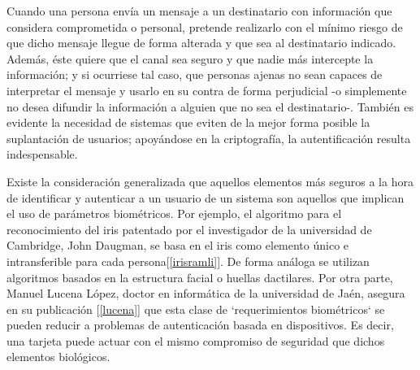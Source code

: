 \documentclass[../PFC.tex]{subfiles}
\begin{document}
Cuando una persona envía un mensaje a un destinatario con información que considera comprometida o personal, pretende realizarlo con el mínimo riesgo de que dicho mensaje llegue de forma alterada y que sea al destinatario indicado. Además, éste quiere que el canal sea seguro y que nadie más intercepte la información; y si ocurriese tal caso, que personas ajenas no sean capaces de interpretar el mensaje y usarlo en su contra de forma perjudicial -o simplemente no desea difundir la información a alguien que no sea el destinatario-. También es evidente la necesidad de sistemas que eviten de la mejor forma posible la suplantación de usuarios; apoyándose en la criptografía, la autentificación resulta indespensable.



Existe la consideración generalizada que aquellos elementos más seguros a la hora de identificar y autenticar a un usuario de un sistema son aquellos que implican el uso de parámetros biométricos. Por ejemplo, el algoritmo para el reconocimiento del iris patentado por el investigador de la universidad de Cambridge, John Daugman, se basa en el iris como elemento único e intransferible para cada persona[\ref{irisramli}]. De forma análoga se utilizan algoritmos basados en la estructura facial o huellas dactilares. Por otra parte, Manuel Lucena López, doctor en informática de la universidad de Jaén, asegura en su publicación [\ref{lucena}] que esta clase de `requerimientos biométricos` se pueden reducir a problemas de autenticación basada en dispositivos. Es decir, una tarjeta puede actuar con el mismo compromiso de seguridad que dichos elementos biológicos.\\
\end{document}
